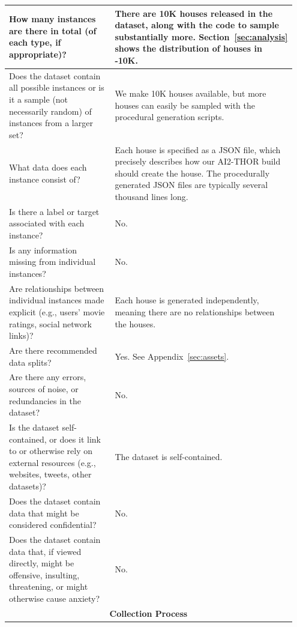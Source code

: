 \begin{longtable}{p{0.35\linewidth} |p{0.6\linewidth} }
    \\[0.15in]
    \midrule
    How many instances are there in total (of each type, if appropriate)? & There are 10K houses released in the dataset, along with the code to sample substantially more. Section~\ref{sec:analysis} shows the distribution of houses in \env{}-10K. \\[0.15in]
    \midrule
    Does the dataset contain all possible instances or is it a sample (not necessarily random) of instances from a larger set? & We make 10K houses available, but more houses can easily be sampled with the procedural generation scripts.\\[0.15in]
    \midrule
    What data does each instance consist of? & Each house is specified as a JSON file, which precisely describes how our AI2-THOR build should create the house. The procedurally generated JSON files are typically several thousand lines long.\\[0.15in]
    \midrule
    Is there a label or target associated with each instance? & No.\\[0.15in]
    \midrule
    Is any information missing from individual instances? & No.\\[0.15in]
    \midrule
    Are relationships between individual instances made explicit (e.g., users' movie ratings, social network links)? & Each house is generated independently, meaning there are no relationships between the houses.\\[0.15in]
    \midrule
    Are there recommended data splits? & Yes. See Appendix~\ref{sec:assets}.\\[0.15in]
    \midrule
    Are there any errors, sources of noise, or redundancies in the dataset? & No.\\[0.15in]
    \midrule
    Is the dataset self-contained, or does it link to or otherwise rely on external resources (e.g., websites, tweets, other datasets)? & The dataset is self-contained.\\[0.15in]
    \midrule
    Does the dataset contain data that might be considered confidential? & No.\\[0.15in]
    \midrule
    Does the dataset contain data that, if viewed directly, might be offensive, insulting, threatening, or might otherwise cause anxiety? & No.\\
    \bottomrule
        \multicolumn{2}{c}{\rule{0in}{0.2in}\textbf{Collection Process}\vspace{0.10in}}\\

\end{longtable}
